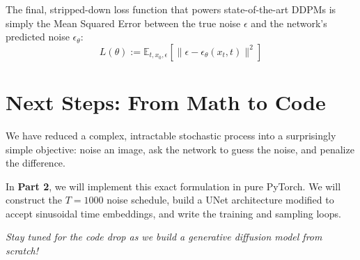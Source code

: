 \documentclass[12pt]{article}
\begin{document}
The final, stripped-down loss function that powers state-of-the-art DDPMs is simply the Mean Squared Error between the true noise $\epsilon$ and the network's predicted noise $\epsilon_\theta$:
\begin{equation}
    L(\theta) := \mathbb{E}_{t, x_0, \epsilon} \left[ \| \epsilon - \epsilon_\theta(x_t, t) \|^2 \right]
\end{equation}

\section*{Next Steps: From Math to Code}
We have reduced a complex, intractable stochastic process into a surprisingly simple objective: noise an image, ask the network to guess the noise, and penalize the difference.

In \textbf{Part 2}, we will implement this exact formulation in pure PyTorch. We will construct the $T=1000$ noise schedule, build a UNet architecture modified to accept sinusoidal time embeddings, and write the training and sampling loops.

\vspace{1em}
\noindent \textit{Stay tuned for the code drop as we build a generative diffusion model from scratch!}
\end{document}
